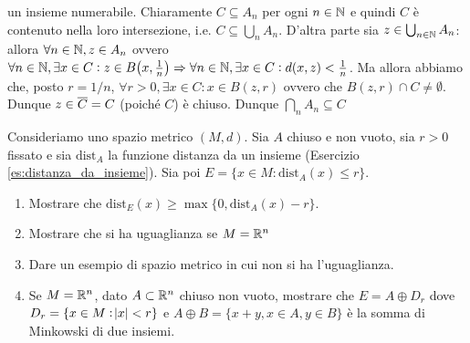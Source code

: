 \documentclass[a4paper]{article}\par \usepackage{style}\par
\begin{document}
un insieme numerabile. Chiaramente $ C \subseteq A_n $ per ogni $ n \in \mathbb{N} $ e quindi $ C $ è contenuto nella loro intersezione, i.e. $ C \subseteq \bigcup_{n} A_n $. D'altra parte sia $ z \in \bigcup_{n \in \mathbb{N}} A_n $: allora $ \forall n \in \mathbb{N}, z \in A_n $ ovvero $ \forall n \in \mathbb{N}, \exists x \in C : z \in B{\left(x, \frac{1}{n}\right)} \Rightarrow \forall n \in \mathbb{N}, \exists x \in C : d(x, z) < \frac{1}{n} $. Ma allora abbiamo che, posto $ r = 1/n $, $ \forall r > 0, \exists x \in C : x \in B(z, r) $ ovvero che $ B(z, r) \cap C \neq \emptyset $. Dunque $ z \in \overline{C} = C $ (poiché $ C $) è chiuso. Dunque $ \bigcap_{n} A_n \subseteq C $\par \begin{es}
  Consideriamo uno spazio metrico $ (M, d) $. Sia $ A $ chiuso e non vuoto, sia $ r > 0 $ fissato e sia $ \mathrm{dist}_A $ la funzione distanza da un insieme (Esercizio \ref{es:distanza_da_insieme}). Sia poi $ E = \{x \in M : \mathrm{dist}_A(x) \leq r\} $.
  \begin{enumerate}[label = (\roman*)]
  \item Mostrare che $ \mathrm{dist}_E(x) \geq \max{\{0, \mathrm{dist}_A(x) - r\}} $.
  \item Mostrare che si ha uguaglianza se $ M = \mathbb{R}^n $
  \item Dare un esempio di spazio metrico in cui non si ha l'uguaglianza.
  \item Se $ M = \mathbb{R}^n $, dato $ A \subset \mathbb{R}^n $ chiuso non vuoto, mostrare che $ E = A \oplus D_r $ dove $ D_r = \{x \in M : \abs{x} < r \} $ e $ A \oplus B = \{x + y, x \in A, y \in B\} $ è la somma di Minkowski di due insiemi.
  \end{enumerate}
\end{es}\par {}
\end{document}
